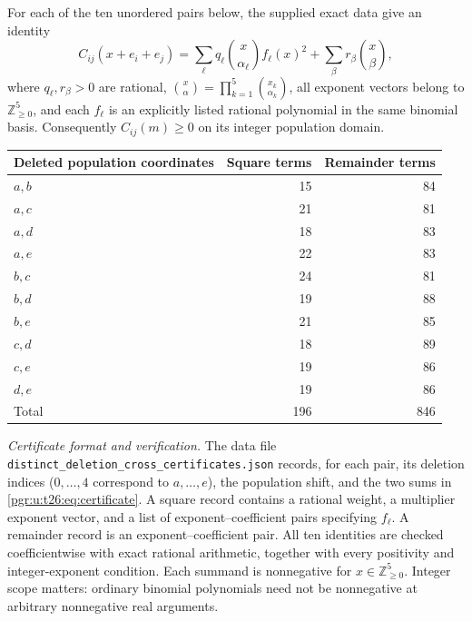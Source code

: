 \documentclass[11pt]{article}
\numberwithin{equation}{section}
\theoremstyle{definition}\newtheorem{definition}[theorem]{Definition}\newtheorem{remark}[theorem]{Remark}
\newcommand{\N}{\mathbb Z_{\ge0}}          %
\newcommand{\file}[1]{\nolinkurl{#1}}     %
\begin{document}
\begin{lemma}\label{pgr:u:t26:lem:quartics}
For each of the ten unordered pairs below, the supplied exact data give an identity
\begin{equation}\label{pgr:u:t26:eq:certificate}
C_{ij}(x+e_i+e_j)
=\sum_{\ell}q_{\ell}\binom{x}{\alpha_{\ell}}f_{\ell}(x)^2
 +\sum_{\beta}r_{\beta}\binom{x}{\beta},
\end{equation}
where $q_{\ell},r_{\beta}>0$ are rational,
$\binom{x}{\alpha}=\prod_{k=1}^{5}\binom{x_k}{\alpha_k}$,
all exponent vectors belong to $\N^5$, and each $f_{\ell}$ is an explicitly listed rational polynomial in the same binomial basis. Consequently $C_{ij}(m)\ge0$ on its integer population domain.
\end{lemma}
\begin{center}
\begin{tabular}{@{}lrr@{}}\toprule
Deleted population coordinates & Square terms & Remainder terms\\\midrule
$a,b$ & 15 & 84\\
$a,c$ & 21 & 81\\
$a,d$ & 18 & 83\\
$a,e$ & 22 & 83\\
$b,c$ & 24 & 81\\
$b,d$ & 19 & 88\\
$b,e$ & 21 & 85\\
$c,d$ & 18 & 89\\
$c,e$ & 19 & 86\\
$d,e$ & 19 & 86\\\midrule
Total & 196 & 846\\\bottomrule
\end{tabular}
\end{center}

\noindent\emph{Certificate format and verification.}
The data file \file{distinct_deletion_cross_certificates.json} records, for each pair, its deletion indices ($0,\ldots,4$ correspond to $a,\ldots,e$), the population shift, and the two sums in \eqref{pgr:u:t26:eq:certificate}. A square record contains a rational weight, a multiplier exponent vector, and a list of exponent--coefficient pairs specifying $f_{\ell}$. A remainder record is an exponent--coefficient pair. All ten identities are checked coefficientwise with exact rational arithmetic, together with every positivity and integer-exponent condition. Each summand is nonnegative for $x\in\N^5$. Integer scope matters: ordinary binomial polynomials need not be nonnegative at arbitrary nonnegative real arguments.
\end{document}
